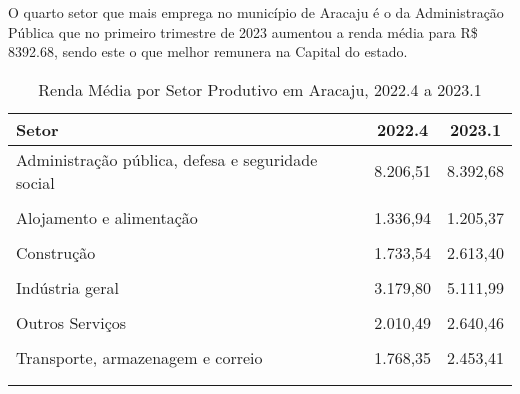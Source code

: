 \documentclass[preprint, 3p,
authoryear]{elsarticle} %
\begin{document}
O quarto setor que mais emprega no município de Aracaju é o da
Administração Pública que no primeiro trimestre de 2023 aumentou a renda
média para R\$ 8392.68, sendo este o que melhor remunera na Capital do
estado.

\FloatBarrier
\begingroup\fontsize{9}{11}\selectfont

\begin{longtable}[t]{>{\raggedright\arraybackslash}p{13.3cm}cc}
\caption{\label{tab:tab12}\label{tab12}Renda Média por Setor Produtivo em Aracaju, 2022.4 a 2023.1}\\
\toprule
Setor & 2022.4 & 2023.1\\
\midrule
Administração pública, defesa e seguridade social  & 8.206,51 & 8.392,68\\
\cellcolor[HTML]{DCDCDC}{Agricultura, pecuária, produção florestal, pesca e aquicultura} & \cellcolor[HTML]{DCDCDC}{7.142,50} & \cellcolor[HTML]{DCDCDC}{9.466,37}\\
Alojamento e alimentação  & 1.336,94 & 1.205,37\\
\cellcolor[HTML]{DCDCDC}{Comércio, reparação de veículos automotores e motocicletas} & \cellcolor[HTML]{DCDCDC}{1.880,50} & \cellcolor[HTML]{DCDCDC}{2.228,80}\\
Construção & 1.733,54 & 2.613,40\\
\addlinespace
\cellcolor[HTML]{DCDCDC}{Educação, saúde humana e serviços sociais} & \cellcolor[HTML]{DCDCDC}{5.321,67} & \cellcolor[HTML]{DCDCDC}{6.176,11}\\
Indústria geral & 3.179,80 & 5.111,99\\
\cellcolor[HTML]{DCDCDC}{Informação, comunicação e atividades financeiras, imobiliárias, profissionais e administrativas} & \cellcolor[HTML]{DCDCDC}{3.862,04} & \cellcolor[HTML]{DCDCDC}{3.359,32}\\
Outros Serviços & 2.010,49 & 2.640,46\\
\cellcolor[HTML]{DCDCDC}{Serviços domésticos} & \cellcolor[HTML]{DCDCDC}{1.064,14} & \cellcolor[HTML]{DCDCDC}{941,74}\\
\addlinespace
Transporte, armazenagem e correio  & 1.768,35 & 2.453,41\\
\bottomrule
\multicolumn{3}{l}{\rule{0pt}{1em}\textit{Fonte: IBGE (2023).}}\\
\multicolumn{3}{l}{\rule{0pt}{1em}}\\
\end{longtable}
\endgroup{}

\newpage

\renewcommand\refname{References}

\end{document}
